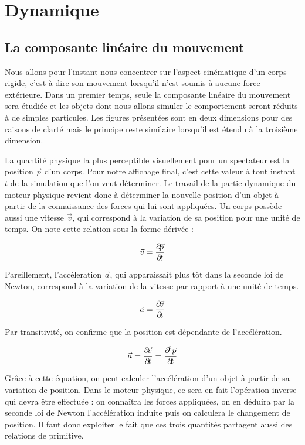 \section{Dynamique} 

\subsection{La composante linéaire du mouvement}

Nous allons pour l'instant nous concentrer sur l'aspect cinématique
d'un corps rigide, c'est à dire son mouvement lorsqu'il n'est soumis à
aucune force extérieure. Dans un premier temps, seule la composante
linéaire du mouvement sera étudiée et les objets dont nous allons
simuler le comportement seront réduits à de simples particules. Les
figures présentées sont en deux dimensions pour des raisons de clarté
mais le principe reste similaire lorsqu'il est étendu à la troisième
dimension.

La quantité physique la plus perceptible visuellement pour un
spectateur est la position $\vec p$ d'un corps. Pour notre affichage
final, c'est cette valeur à tout instant $t$ de la simulation que l'on
veut déterminer. Le travail de la partie dynamique du moteur physique
revient donc à déterminer la nouvelle position d'un objet à partir de
la connaissance des forces qui lui sont appliquées. Un corps possède
aussi une vitesse $\vec v$, qui correspond à la variation de sa
position pour une unité de temps. On note cette relation sous la forme
dérivée :

\begin{align*}
  \vec{v} = \frac{\partial \! \vec{p}}{\partial \! t}
\end{align*}

Pareillement, l'accéleration $\vec a$, qui apparaissaît plus tôt dans
la seconde loi de Newton, correspond à la variation de la vitesse par
rapport à une unité de temps.

\begin{align*}
  \vec{a} = \frac{\partial \! \vec{v}}{\partial \! t}
\end{align*}

Par transitivité, on confirme que la position est dépendante de
l'accélération.

\begin{align*}
  \vec{a} = \frac{\partial \! \vec{v}}{\partial \! t} = \frac{\partial \!^2
    \vec{p}}{\partial \! t}
\end{align*}

Grâce à cette équation, on peut calculer l'accélération d'un objet à
partir de sa variation de position. Dans le moteur physique, ce sera
en fait l'opération inverse qui devra être effectuée : on connaîtra
les forces appliquées, on en déduira par la seconde loi de Newton
l'accélération induite puis on calculera le changement de position. Il
faut donc exploiter le fait que ces trois quantités partagent aussi
des relations de primitive.

